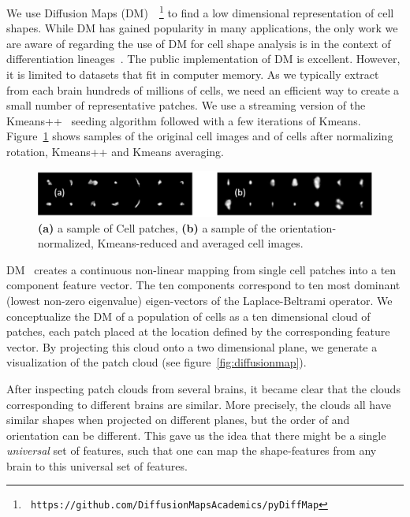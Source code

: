 \documentclass[runningheads]{llncs}
\begin{document}
We use Diffusion Maps
(DM)~\cite{belkin2003,coifman2005geometric}~\footnote{{\tt
    https://github.com/DiffusionMapsAcademics/pyDiffMap}} to find a
low dimensional representation of cell shapes. While DM has gained
popularity in many applications, the only work we are aware of
regarding the use of DM for cell shape analysis is in the context of
differentiation lineages~\cite{haghverdi2015diffusion}.
The public implementation of DM is excellent. However, it is limited to datasets that
fit in computer memory. As we typically extract from each brain
hundreds of millions of cells, we need an efficient way to create a
small number of representative patches.  We use a streaming version of
the Kmeans++~\cite{arthur2006k} seeding algorithm followed with a few
iterations of Kmeans. Figure~\ref{fig:kmeans} shows samples of the
original cell images and of cells after normalizing
rotation, Kmeans++ and Kmeans averaging.
\begin{figure}[t]
  \includegraphics[width=\textwidth]{Images/CellImages.png}
\caption{{\bf (a)} a sample of Cell patches,
  {\bf (b)}  a sample of the orientation-normalized, Kmeans-reduced and averaged cell images.}
\label{fig:kmeans}
\end{figure}

DM~\cite{coifman2005geometric} creates a continuous
non-linear mapping from single cell patches into a ten component
feature vector. The ten components correspond to ten most dominant
(lowest non-zero eigenvalue) eigen-vectors of the Laplace-Beltrami
operator. We conceptualize the DM of a population of cells as
a ten dimensional cloud of patches, each patch placed at the location
defined by the corresponding feature vector. By projecting this cloud
onto a two dimensional plane, we generate a visualization of the patch
cloud (see figure~\ref{fig:diffusionmap}).

After inspecting patch clouds from several brains, it became clear
that the clouds corresponding to different brains are similar. More
precisely, the clouds all have similar shapes when projected on
different planes, but the order of and orientation can be
different. This gave us the idea that there might be a single {\em
  universal} set of features, such that one can map the shape-features from
any brain to this universal set of features.
\end{document}
